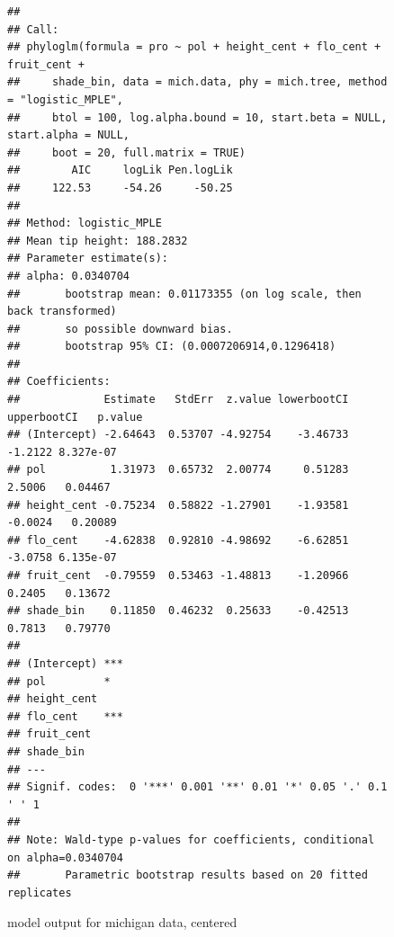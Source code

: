 \documentclass{article}\usepackage[]{graphicx}\usepackage[]{color}
\makeatletter
\newenvironment{kframe}{%
 \def\at@end@of@kframe{}%
 \ifinner\ifhmode%
  \def\at@end@of@kframe{\end{minipage}}%
  \begin{minipage}{\columnwidth}%
 \fi\fi%
 \def\FrameCommand##1{\hskip\@totalleftmargin \hskip-\fboxsep
 \colorbox{shadecolor}{##1}\hskip-\fboxsep
     \hskip-\linewidth \hskip-\@totalleftmargin \hskip\columnwidth}%
 \MakeFramed {\advance\hsize-\width
   \@totalleftmargin\z@ \linewidth\hsize
   \@setminipage}}%
 {\par\unskip\endMakeFramed%
 \at@end@of@kframe}
\newenvironment{knitrout}{}{} %
\makeatother
\begin{document}
\begin{figure}[h!]
\begin{knitrout}
\color{fgcolor}\begin{kframe}
\begin{verbatim}
## 
## Call:
## phyloglm(formula = pro ~ pol + height_cent + flo_cent + fruit_cent + 
##     shade_bin, data = mich.data, phy = mich.tree, method = "logistic_MPLE", 
##     btol = 100, log.alpha.bound = 10, start.beta = NULL, start.alpha = NULL, 
##     boot = 20, full.matrix = TRUE)
##        AIC     logLik Pen.logLik 
##     122.53     -54.26     -50.25 
## 
## Method: logistic_MPLE
## Mean tip height: 188.2832
## Parameter estimate(s):
## alpha: 0.0340704 
##       bootstrap mean: 0.01173355 (on log scale, then back transformed)
##       so possible downward bias.
##       bootstrap 95% CI: (0.0007206914,0.1296418)
## 
## Coefficients:
##             Estimate   StdErr  z.value lowerbootCI upperbootCI   p.value
## (Intercept) -2.64643  0.53707 -4.92754    -3.46733     -1.2122 8.327e-07
## pol          1.31973  0.65732  2.00774     0.51283      2.5006   0.04467
## height_cent -0.75234  0.58822 -1.27901    -1.93581     -0.0024   0.20089
## flo_cent    -4.62838  0.92810 -4.98692    -6.62851     -3.0758 6.135e-07
## fruit_cent  -0.79559  0.53463 -1.48813    -1.20966      0.2405   0.13672
## shade_bin    0.11850  0.46232  0.25633    -0.42513      0.7813   0.79770
##                
## (Intercept) ***
## pol         *  
## height_cent    
## flo_cent    ***
## fruit_cent     
## shade_bin      
## ---
## Signif. codes:  0 '***' 0.001 '**' 0.01 '*' 0.05 '.' 0.1 ' ' 1
## 
## Note: Wald-type p-values for coefficients, conditional on alpha=0.0340704
##       Parametric bootstrap results based on 20 fitted replicates
\end{verbatim}
\end{kframe}
\end{knitrout}
\caption{model output for michigan data, centered}
\end{figure}
\end{document}

